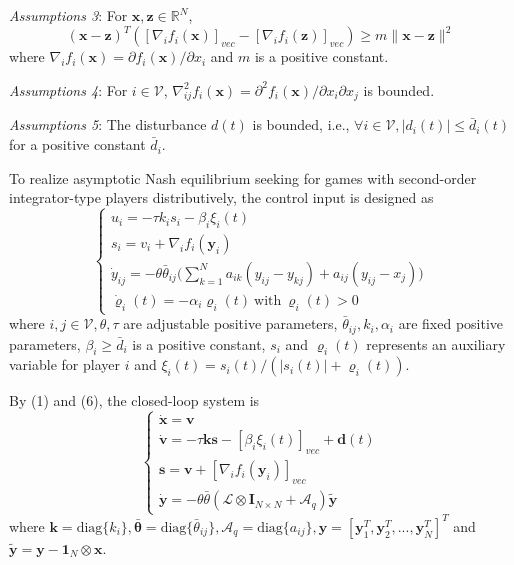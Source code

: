 \documentclass[12pt, a4paper, oneside]{ctexbook}
\begin{document}
\emph{Assumptions 3}: For $\mathbf{x}, \mathbf{z} \in \mathbb{R}^N$,
\begin{equation}
    (\mathbf{x}-\mathbf{z})^T([\nabla_if_i(\mathbf{x})]_{vec}-[\nabla_if_i(\mathbf{z})]_{vec})\geq m\|\mathbf{x}-\mathbf{z}\|^2
\end{equation}
where $\nabla_{i}f_{i}(\mathbf{x})=\partial f_{i}(\mathbf{x})/\partial x_{i}$ and $m$ is a positive constant.

\emph{Assumptions 4}: For $i \in \mathcal{V}$, $\nabla_{ij}^{2}f_{i}(\mathbf{x})=\partial^{2}f_{i}(\mathbf{x})/\partial x_{i}\partial x_{j}$ is bounded.

\emph{Assumptions 5}: The disturbance $d(t)$ is bounded, i.e., $\forall i \in \mathcal{V}, |d_i(t)|\leq \bar{d}_i(t)$ for a positive constant $\bar{d}_i$.

To realize asymptotic Nash equilibrium seeking for games with second-order integrator-type players distributively, the control input is designed as
\begin{equation}
    \begin{cases}
        u_i=-\tau k_is_i-\beta_i\xi_i(t)                                                                      \\
        s_i=v_i+\nabla_if_i(\mathbf{y}_i)                                                                     \\
        \dot{y}_{ij}=-\theta\bar{\theta}_{ij}\Bigg(\sum_{k=1}^Na_{ik}(y_{ij}-y_{kj})+a_{ij}(y_{ij}-x_j)\Bigg) \\
        \dot{\varrho}_i(t) = -\alpha_i \varrho_i(t)~\text{with}~\varrho_i(t) > 0
    \end{cases}
\end{equation}
where $i,j \in \mathcal{V}, \theta, \tau$ are adjustable positive parameters, $\bar{\theta}_{ij}, k_i, \alpha_i$ are fixed positive parameters, $\beta_i \geq \bar{d}_i$ is a positive constant, $s_i$ and $\varrho_i(t)$ represents an auxiliary variable for player $i$ and $\xi_i(t) = s_i(t)/(|s_i(t)| + \varrho_i(t))$.

By (1) and (6), the closed-loop system is
\begin{equation}
    \begin{cases}
        \dot{\mathbf{x}}=\mathbf{v}                                                      \\
        \dot{\mathbf{v}}=-\tau\mathbf{k}\mathbf{s}-[\beta_i\xi_i(t)]_{vec}+\mathbf{d}(t) \\
        \mathbf{s}=\mathbf{v}+[\nabla_if_i(\mathbf{y}_i)]_{vec}                          \\
        \dot{\mathbf{y}}=-\theta\bar{\theta}(\mathcal{L}\otimes\mathbf{I}_{N\times N}+\mathcal{A}_q)\tilde{\mathbf{y}}
    \end{cases}
\end{equation}
where $\mathbf{k} = \text{diag}\{k_i\},
    \bar{\mathbf{\theta}} = \text{diag}\{\bar{\theta}_{ij}\},
    \mathcal{A}_q = \text{diag}\{a_{ij}\}, \mathbf{y} = [\mathbf{y}_1^T,\mathbf{y}_2^T,...,\mathbf{y}_N^T]^T$ and $\tilde{\mathbf{y}} = \mathbf{y} - \mathbf{1}_N \otimes \mathbf{x}$.
\end{document}
